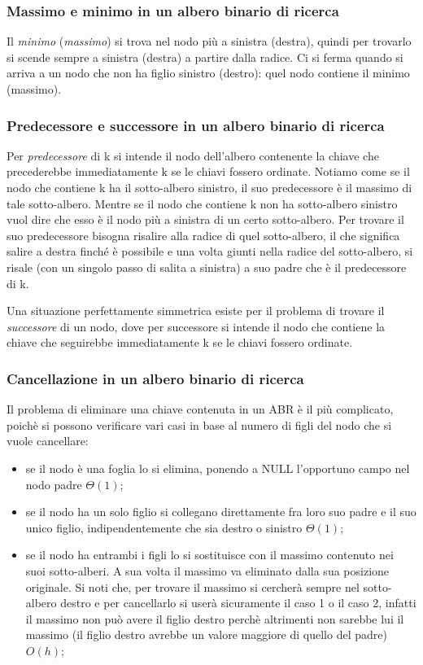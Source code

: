 \subsubsection{Massimo e minimo in un albero binario di ricerca}
Il \textit{minimo} (\textit{massimo}) si trova nel nodo più a sinistra (destra), quindi per trovarlo si scende sempre a sinistra (destra) a partire dalla radice. Ci si ferma quando si arriva a un nodo che non ha figlio sinistro (destro): quel nodo contiene il minimo (massimo).

\subsubsection{Predecessore e successore in un albero binario di ricerca}
Per \textit{predecessore} di k si intende il nodo dell'albero contenente la chiave che precederebbe immediatamente k se le chiavi fossero ordinate. Notiamo come se il nodo che contiene k ha il sotto-albero sinistro, il suo predecessore è il massimo di tale sotto-albero. Mentre se il nodo che contiene k non ha sotto-albero sinistro vuol dire che esso è il nodo più a sinistra di un certo sotto-albero. Per trovare il suo predecessore bisogna risalire alla radice di quel sotto-albero, il che significa salire a destra finché è possibile e una volta giunti nella radice del sotto-albero, si risale (con un singolo passo di salita a sinistra) a suo padre che è il predecessore di k. 

Una situazione perfettamente simmetrica esiste per il problema di trovare il \textit{successore} di un nodo, dove per successore si intende il nodo che contiene la chiave che seguirebbe immediatamente k se le chiavi fossero ordinate.


\subsubsection{Cancellazione in un albero binario di ricerca}
Il problema di eliminare una chiave contenuta in un ABR è il più complicato, poichè si possono verificare vari casi in base al numero di figli del nodo che si vuole cancellare:
\begin{itemize}
    \item se il nodo è una foglia lo si elimina, ponendo a NULL l’opportuno campo nel nodo padre $\Theta(1)$;
    \item se il nodo ha un solo figlio si collegano direttamente fra loro suo padre e il suo unico figlio, indipendentemente che sia destro o sinistro $\Theta(1)$;
    \item se il nodo ha entrambi i figli lo si sostituisce con il massimo contenuto nei suoi sotto-alberi. A sua volta il massimo va eliminato dalla sua posizione originale. Si noti che, per trovare il massimo si cercherà sempre nel sotto-albero destro e per cancellarlo si userà sicuramente il caso 1 o il caso 2, infatti il massimo non può avere il figlio destro perchè altrimenti non sarebbe lui il massimo (il figlio destro avrebbe un valore maggiore di quello del padre) $O(h)$;
\end{itemize}


